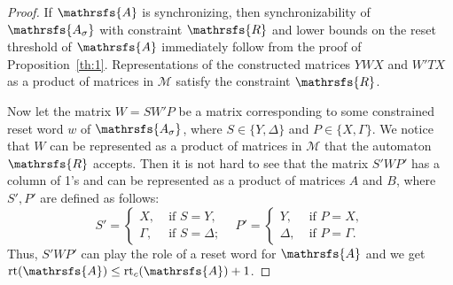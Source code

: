 \documentclass[11pt]{llncs}
\newcommand{\A}{\mathrsfs{A}}
\newcommand{\R}{\mathrsfs{R}}
\newcommand{\AD}{\mathrsfs{A_{\sigma}}}
\newcommand{\G}{\Gamma}
\newcommand{\D}{\Delta}
\newcommand{\rt}{\mathrm{rt}}
\newcommand{\rtc}{\mathrm{rt}_{c}}
\begin{document}
\begin{proof}
If $\A$ is synchronizing, then synchronizability of $\AD$ with constraint $\R$ and lower bounds on the reset threshold of $\A$ immediately
follow from the proof of Proposition~\ref{th:1}. Representations of the constructed matrices $YWX$ and $W'TX$ as a product of matrices in
$\mathcal{M}$ satisfy the constraint $\R$.

Now let the matrix $W = SW'P$ be a matrix corresponding to some constrained reset word $w$ of $\AD$, where $S \in \{Y, \D\}$ and $P \in \{
X, \G\}$. We notice that $W$ can be represented as a product of matrices in $\mathcal{M}$ that the automaton $\R$ accepts. Then it is not
hard to see that the matrix $S'WP'$ has a column of 1's and can be represented as a product of matrices $A$ and $B$, where $S',P'$ are
defined as follows:
$$
S' =
\begin{cases}
X,\;& \mbox{if } S = Y,\\
\G,\;& \mbox{if } S = \D;
\end{cases}\;\;\;
P' =
\begin{cases}
Y,\;& \mbox{if } P = X,\\
\D,\;& \mbox{if } P = \G.
\end{cases}
$$
Thus, $S'WP'$ can play the role of a reset word for $\A$ and we get $\rt(\A) \leq \rtc(\A) + 1$.
\end{proof}
\end{document}
